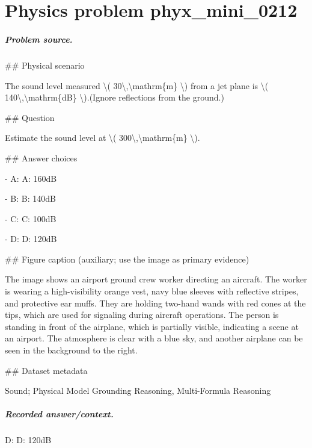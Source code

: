 
\chapter{Physics problem phyx\_mini\_0212}
\label{ch:PhyXMiniProblems_problem_phyx_mini_0212}

\paragraph{Problem source.}
\#\# Physical scenario

The sound level measured \textbackslash{}( 30\textbackslash{},\textbackslash{}mathrm\{m\} \textbackslash{}) from a jet plane is \textbackslash{}( 140\textbackslash{},\textbackslash{}mathrm\{dB\} \textbackslash{}).(Ignore reflections from the ground.)

\#\# Question

Estimate the sound level at \textbackslash{}( 300\textbackslash{},\textbackslash{}mathrm\{m\} \textbackslash{}).

\#\# Answer choices

- A: A: 160dB

- B: B: 140dB

- C: C: 100dB

- D: D: 120dB

\#\# Figure caption (auxiliary; use the image as primary evidence)

The image shows an airport ground crew worker directing an aircraft. The worker is wearing a high-visibility orange vest, navy blue sleeves with reflective stripes, and protective ear muffs. They are holding two-hand wands with red cones at the tips, which are used for signaling during aircraft operations. The person is standing in front of the airplane, which is partially visible, indicating a scene at an airport. The atmosphere is clear with a blue sky, and another airplane can be seen in the background to the right.

\#\# Dataset metadata

Sound; Physical Model Grounding Reasoning, Multi-Formula Reasoning

\paragraph{Recorded answer/context.}
D: D: 120dB


